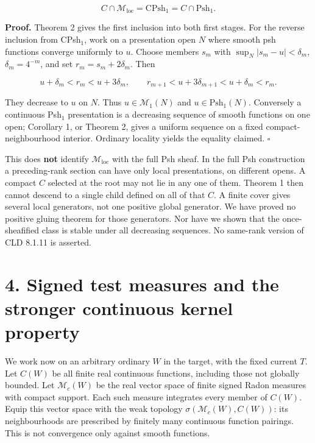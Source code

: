 \documentclass[
  11pt,
]{article}
\begin{document}
\[
C\cap\mathcal M_{\mathrm{loc}}
 =\mathrm{CPsh}_1=C\cap\mathrm{Psh}_1.
\]

\textbf{Proof.} Theorem 2 gives the first inclusion into both first
stages. For the reverse inclusion from CPsh\(_1\), work on a
presentation open \(N\) where smooth psh functions converge uniformly to
\(u\). Choose members \(s_m\) with \(\sup_N|s_m-u|<\delta_m\),
\(\delta_m=4^{-m}\), and set \(r_m=s_m+2\delta_m\). Then

\[
u+\delta_m<r_m<u+3\delta_m,
\qquad r_{m+1}<u+3\delta_{m+1}<u+\delta_m<r_m.
\]

They decrease to \(u\) on \(N\). Thus \(u\in\mathcal M_1(N)\) and
\(u\in\mathrm{Psh}_1(N)\). Conversely a continuous Psh\(_1\)
presentation is a decreasing sequence of smooth functions on one open;
Corollary 1, or Theorem 2, gives a uniform sequence on a fixed
compact-neighbourhood interior. Ordinary locality yields the equality
claimed. \(\square\)

This does \textbf{not} identify \(\mathcal M_{\mathrm{loc}}\) with the
full Psh sheaf. In the full Psh construction a preceding-rank section
can have only local presentations, on different opens. A compact \(C\)
selected at the root may not lie in any one of them. Theorem 1 then
cannot descend to a single child defined on all of that \(C\). A finite
cover gives several local generators, not one positive global generator.
We have proved no positive gluing theorem for those generators. Nor have
we shown that the once-sheafified class is stable under all decreasing
sequences. No same-rank version of CLD 8.1.11 is asserted.

\section{4. Signed test measures and the stronger continuous kernel
property}\label{signed-test-measures-and-the-stronger-continuous-kernel-property}

We work now on an arbitrary ordinary \(W\) in the target, with the fixed
current \(T\). Let \(C(W)\) be all finite real continuous functions,
including those not globally bounded. Let \(\mathscr M_c(W)\) be the
real vector space of finite signed Radon measures with compact support.
Each such measure integrates every member of \(C(W)\). Equip this vector
space with the weak topology \(\sigma(\mathscr M_c(W),C(W))\): its
neighbourhoods are prescribed by finitely many continuous function
pairings. This is not convergence only against smooth functions.
\end{document}

